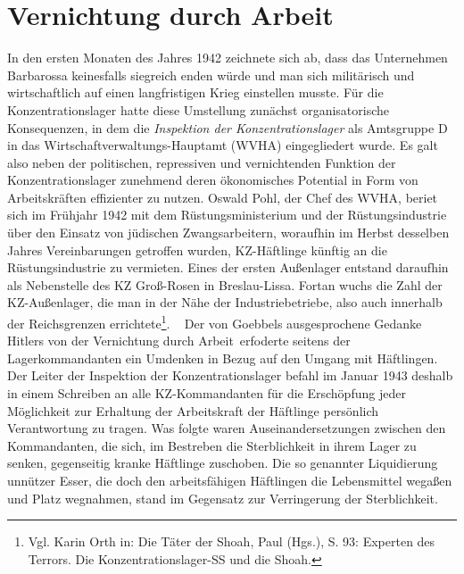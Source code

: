 \section{Vernichtung durch Arbeit}
In den ersten Monaten des Jahres 1942 zeichnete sich ab, dass das Unternehmen Barbarossa keinesfalls siegreich enden würde und man sich militärisch und wirtschaftlich auf einen langfristigen Krieg einstellen musste. Für die Konzentrationslager hatte diese Umstellung zunächst organisatorische Konsequenzen, in dem die \emph{Inspektion der Konzentrationslager} als Amtsgruppe D in das Wirtschaftverwaltungs-Hauptamt (WVHA) eingegliedert wurde. Es galt also neben der politischen, repressiven und vernichtenden Funktion der Konzentrationslager zunehmend deren ökonomisches Potential in Form von Arbeitskräften effizienter zu nutzen.
Oswald Pohl, der Chef des WVHA, beriet sich im Frühjahr 1942 mit dem Rüstungsministerium und der Rüstungsindustrie über den Einsatz von jüdischen Zwangsarbeitern, woraufhin im Herbst desselben Jahres Vereinbarungen getroffen wurden, KZ-Häftlinge künftig an die Rüstungsindustrie zu vermieten. Eines der ersten Außenlager  entstand daraufhin als Nebenstelle des KZ Groß-Rosen in Breslau-Lissa. Fortan wuchs die Zahl der KZ-Außenlager, die man in der Nähe der Industriebetriebe, also auch innerhalb der Reichsgrenzen errichtete\footnote{Vgl. Karin Orth in: \glqq Die Täter der Shoah\grqq, Paul (Hgs.), S. 93: \glqq Experten des Terrors. Die Konzentrationslager-SS und die Shoah\grqq.}.
~\newline
Der von Goebbels ausgesprochene Gedanke Hitlers von der \glqq Vernichtung durch Arbeit\grqq~erfoderte seitens der Lagerkommandanten ein Umdenken in Bezug auf den Umgang mit Häftlingen.
Der Leiter der Inspektion der Konzentrationslager befahl im Januar 1943 deshalb in einem Schreiben an alle KZ-Kommandanten \glqq für die Erschöpfung jeder Möglichkeit zur Erhaltung der Arbeitskraft der Häftlinge persönlich Verantwortung zu tragen\grqq. Was folgte waren Auseinandersetzungen zwischen den Kommandanten, die sich, im Bestreben die Sterblichkeit in ihrem Lager zu senken, gegenseitig kranke Häftlinge zuschoben. Die so genannter Liquidierung unnützer Esser, die doch den arbeitsfähigen Häftlingen die Lebensmittel wegaßen und Platz wegnahmen, stand im Gegensatz zur Verringerung der Sterblichkeit.
